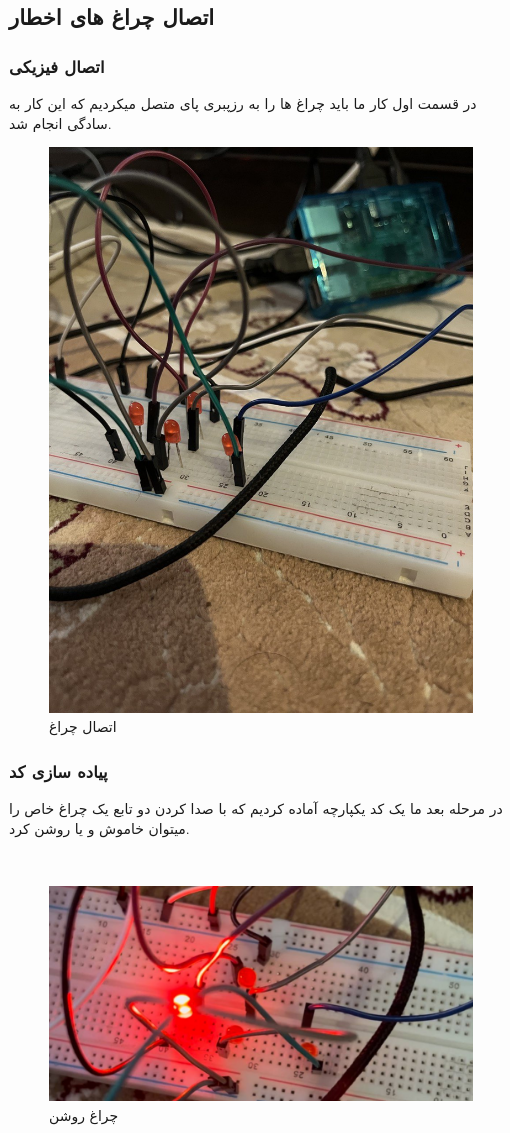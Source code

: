 \documentclass[12pt]{article}
\begin{document}
\newpage
\subsection{اتصال چراغ های اخطار}

\subsubsection{اتصال فیزیکی}

در قسمت اول کار ما باید چراغ ها را به رزپبری پای متصل میکردیم که این کار به سادگی انجام شد.

\begin{figure}[h]
	\begin{center}
		\includegraphics[width=.50\textwidth]{images/led.jpg}
	\end{center}
	\caption{اتصال چراغ}
\end{figure}

\subsubsection{پیاده سازی کد}


در مرحله بعد ما یک کد یکپارچه آماده کردیم که با صدا کردن دو تابع یک چراغ خاص را میتوان خاموش و یا روشن کرد.

\\ 

\begin{figure}[h]
	\begin{center}
		\includegraphics[width=.50\textwidth]{images/led-on.jpg}
	\end{center}
	\caption{چراغ روشن}
\end{figure}
\\
\end{document}
